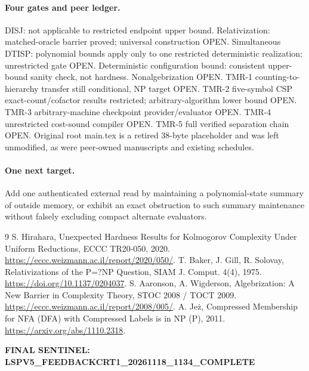 \documentclass[11pt]{article}
\begin{document}
\paragraph{Four gates and peer ledger.}
DISJ: not applicable to restricted endpoint upper bound. Relativization: matched-oracle barrier proved; universal construction OPEN. Simultaneous DTISP: polynomial bounds apply only to one restricted deterministic realization; unrestricted gate OPEN. Deterministic configuration bound: consistent upper-bound sanity check, not hardness. Nonalgebrization OPEN. TMR-1 counting-to-hierarchy transfer still conditional, NP target OPEN. TMR-2 five-symbol CSP exact-count/cofactor results restricted; arbitrary-algorithm lower bound OPEN. TMR-3 arbitrary-machine checkpoint provider/evaluator OPEN. TMR-4 unrestricted cost-sound compiler OPEN. TMR-5 full verified separation chain OPEN. Original root main.tex is a retired 38-byte placeholder and was left unmodified, as were peer-owned manuscripts and existing schedules.
\paragraph{One next target.}
Add one authenticated external read by maintaining a polynomial-state summary of outside memory, or exhibit an exact obstruction to such summary maintenance without falsely excluding compact alternate evaluators.
\begin{thebibliography}{9}
 S. Hirahara, Unexpected Hardness Results for Kolmogorov Complexity Under Uniform Reductions, ECCC TR20-050, 2020. \url{https://eccc.weizmann.ac.il/report/2020/050/}.
 T. Baker, J. Gill, R. Solovay, Relativizations of the P=?NP Question, SIAM J. Comput. 4(4), 1975. \url{https://doi.org/10.1137/0204037}.
 S. Aaronson, A. Wigderson, Algebrization: A New Barrier in Complexity Theory, STOC 2008 / TOCT 2009. \url{https://eccc.weizmann.ac.il/report/2008/005/}.
 A. Je\.z, Compressed Membership for NFA (DFA) with Compressed Labels is in NP (P), 2011. \url{https://arxiv.org/abs/1110.2318}.
\end{thebibliography}
\par\noindent\textbf{FINAL SENTINEL: LSPV5\_FEEDBACKCRT1\_20261118\_1134\_COMPLETE}
\end{document}
